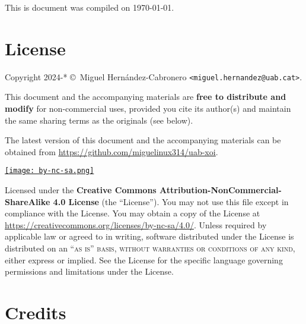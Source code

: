 
\newpage

\thispagestyle{empty}

This is document was compiled on \today.

\section*{License}

\noindent Copyright 2024-* \copyright\ Miguel Hernández-Cabronero \texttt{<miguel.hernandez@uab.cat>}.

\noindent This document and the accompanying materials are \textbf{free to distribute and modify} for non-commercial uses, 
provided you cite its author(s) and maintain the same sharing terms as the originals (see below).

\noindent The latest version of this document and the accompanying materials can be obtained 
from \href{https://github.com/miguelinux314/uab-xoi}{\underline{https://github.com/miguelinux314/uab-xoi}}.

\begin{center}
\noindent\href{https://creativecommons.org/licenses/by-nc-sa/4.0/}{\texttt{[image: by-nc-sa.png]}}
\end{center}

\noindent Licensed under the \textbf{Creative Commons Attribution-NonCommercial-ShareAlike 4.0 License} (the ``License''). You may not use this file except in compliance with the License. You may obtain a copy of the License at \url{https://creativecommons.org/licenses/by-nc-sa/4.0/}. Unless required by applicable law or agreed to in writing, software distributed under the License is distributed on an \textsc{``as is'' basis, without warranties or conditions of any kind}, either express or implied. See the License for the specific language governing permissions and limitations under the License.\\ %

\vfill

\section*{Credits}

